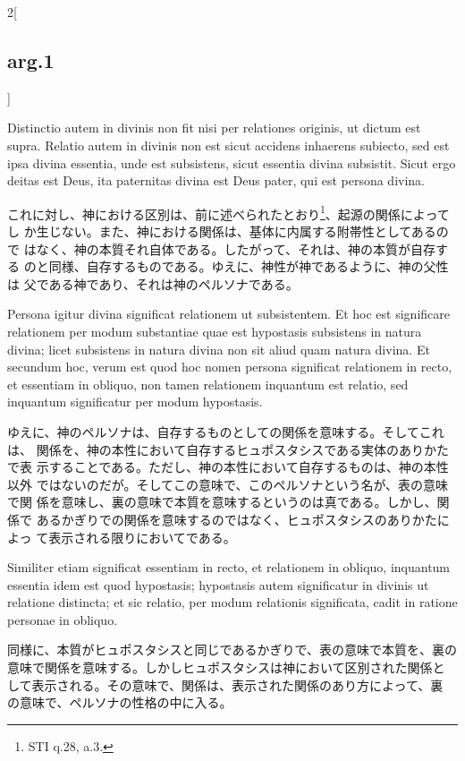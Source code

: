 \documentclass[paper=a4paper,fontsize=10pt,jafontsize=9pt,titlepage]{jlreq}
\begin{document}
\begin{paracol}{2}[\subsection{arg.1}]
\switchcolumn*

Distinctio autem in divinis
non fit nisi per relationes originis, ut dictum est supra. Relatio autem
in divinis non est sicut accidens inhaerens subiecto, sed est ipsa
divina essentia, unde est subsistens, sicut essentia divina
subsistit. Sicut ergo deitas est Deus, ita paternitas divina est Deus
pater, qui est persona divina.

\switchcolumn

これに対し、神における区別は、前に述べられたとおり\footnote{STI q.28, a.3.}、起源の関係によってし
 か生じない。また、神における関係は、基体に内属する附帯性としてあるので
 はなく、神の本質それ自体である。したがって、それは、神の本質が自存する
 のと同様、自存するものである。ゆえに、神性が神であるように、神の父性は
 父である神であり、それは神のペルソナである。

\switchcolumn*

Persona igitur divina significat
relationem ut subsistentem. Et hoc est significare relationem per modum
substantiae quae est hypostasis subsistens in natura divina; licet
subsistens in natura divina non sit aliud quam natura divina. Et
secundum hoc, verum est quod hoc nomen persona significat relationem in
recto, et essentiam in obliquo, non tamen relationem inquantum est
relatio, sed inquantum significatur per modum hypostasis.

\switchcolumn

ゆえに、神のペルソナは、自存するものとしての関係を意味する。そしてこれは、
 関係を、神の本性において自存するヒュポスタシスである実体のありかたで表
 示することである。ただし、神の本性において自存するものは、神の本性以外
 ではないのだが。そしてこの意味で、このペルソナという名が、表の意味で関
 係を意味し、裏の意味で本質を意味するというのは真である。しかし、関係で
 あるかぎりでの関係を意味するのではなく、ヒュポスタシスのありかたによっ
 て表示される限りにおいてである。

\switchcolumn*

Similiter
etiam significat essentiam in recto, et relationem in obliquo, inquantum
essentia idem est quod hypostasis; hypostasis autem significatur in
divinis ut relatione distincta; et sic relatio, per modum relationis
significata, cadit in ratione personae in obliquo.

\switchcolumn

同様に、本質がヒュポスタシスと同じであるかぎりで、表の意味で本質を、裏の
 意味で関係を意味する。しかしヒュポスタシスは神において区別された関係と
 して表示される。その意味で、関係は、表示された関係のあり方によって、裏
 の意味で、ペルソナの性格の中に入る。


\end{paracol}
\end{document}
